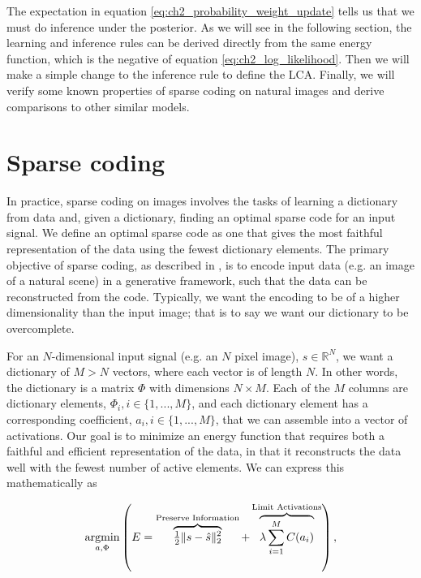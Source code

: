 The expectation in equation \eqref{eq:ch2_probability_weight_update} tells us that we must do inference under the posterior. As we will see in the following section, the learning and inference rules can be derived directly from the same energy function, which is the negative of equation \eqref{eq:ch2_log_likelihood}. Then we will make a simple change to the inference rule to define the LCA. Finally, we will verify some known properties of sparse coding on natural images and derive comparisons to other similar models.


\section{Sparse coding}
In practice, sparse coding on images involves the tasks of learning a dictionary from data and, given a dictionary, finding an optimal sparse code for an input signal. We define an optimal sparse code as one that gives the most faithful representation of the data using the fewest dictionary elements. The primary objective of sparse coding, as described in \parencite{olshausen1997sparse}, is to encode input data (e.g. an image of a natural scene) in a generative framework, such that the data can be reconstructed from the code. Typically, we want the encoding to be of a higher dimensionality than the input image; that is to say we want our dictionary to be overcomplete.

For an $N$-dimensional input signal (e.g. an $N$ pixel image), $s \in \mathbb{R}^{N}$, we want a dictionary of $M > N$ vectors, where each vector is of length $N$. In other words, the dictionary is a matrix $\Phi$ with dimensions $N \times M$. Each of the $M$ columns are dictionary elements, $\Phi_{i}, i \in \{1,...,M\}$, and each dictionary element has a corresponding coefficient, $a_{i}, i \in \{1,...,M\}$, that we can assemble into a vector of activations. Our goal is to minimize an energy function that requires both a faithful and efficient representation of the data, in that it reconstructs the data well with the fewest number of active elements. We can express this mathematically as

\begin{equation}\label{eq:ch2_sparse_energy}
    \argmin\limits_{a, \Phi}
        \left( E =
            \overbrace{ \tfrac{1}{2} \| s - \hat{s} \|_{2}^{2} }^\text{Preserve Information} +
        \overbrace{ \lambda \sum\limits_{i=1}^{M}C(a_{i}) }^\text{Limit Activations} \right),
\end{equation}

